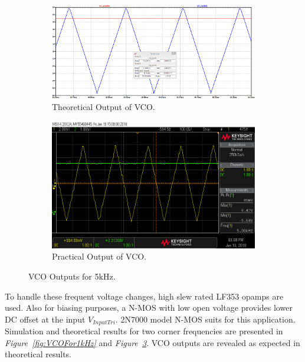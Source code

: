 \documentclass[paper]{IEEEtran}
\begin{document}
\begin{figure}[t!]
	\centering
	\begin{subfigure}{.48\textwidth}
		\centering
		\includegraphics[width=1\linewidth]{scope_24_SimResult}
		\caption{Theoretical Output of VCO.}
		\label{fig:VCOFor5kHzTheoretical}
	\end{subfigure}%
	\newline
	\begin{subfigure}{.48\textwidth}
		\centering
		\includegraphics[width=1\linewidth]{scope_24}
		\caption{Practical Output of VCO.}
		\label{fig:VCOFor5kHzPractical}
	\end{subfigure}
	\caption{VCO Outputs for 5kHz.}
	\label{fig:VCOFor5kHz}
\end{figure}
To handle these frequent voltage changes, high slew rated LF353\cite{b1} opamps are used. Also for biasing purposes, a N-MOS with low open voltage provides lower DC offset at the input $V_{InputTri}$. 2N7000\cite{b2} model N-MOS suits for this application. Simulation and theoretical results for two corner frequencies are presented in \textit{Figure~\ref{fig:VCOFor1kHz}} and \textit{Figure~\ref{fig:VCOFor5kHz}}. VCO outputs are revealed as expected in theoretical results.
\end{document}
